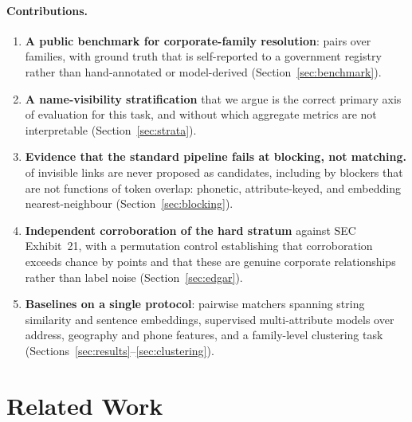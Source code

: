 \paragraph{Contributions.}
\begin{enumerate}
\item \textbf{A public benchmark for corporate-family resolution}: \BenchPairs pairs
over \BenchFamilies families, with ground truth that is self-reported to a government
registry rather than hand-annotated or model-derived (Section~\ref{sec:benchmark}).

\item \textbf{A name-visibility stratification} that we argue is the correct primary
axis of evaluation for this task, and without which aggregate metrics are not
interpretable (Section~\ref{sec:strata}).

\item \textbf{Evidence that the standard pipeline fails at blocking, not matching.}
\BlkInvisibleLost of invisible links are never proposed as candidates, including by
blockers that are not functions of token overlap: phonetic, attribute-keyed, and
embedding nearest-neighbour (Section~\ref{sec:blocking}).

\item \textbf{Independent corroboration of the hard stratum} against SEC Exhibit~21,
with a permutation control establishing that corroboration exceeds chance by
\EdgarExcessOverChance points and that these are genuine corporate relationships rather
than label noise (Section~\ref{sec:edgar}).

\item \textbf{Baselines on a single protocol}: \NumMethods pairwise matchers spanning
string similarity and sentence embeddings, supervised multi-attribute models over
address, geography and phone features, and a family-level clustering task
(Sections~\ref{sec:results}--\ref{sec:clustering}).
\end{enumerate}

\section{Related Work}

